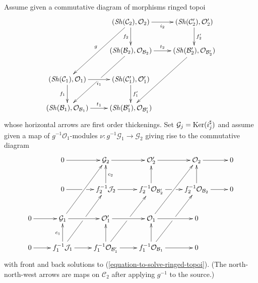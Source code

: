 \begin{lemma}
\label{lemma-huge-diagram-ringed-topoi}
Assume given a commutative diagram of morphisms ringed topoi
\begin{equation}
\label{equation-huge-1-ringed-topoi}
\vcenter{
\xymatrix{
& (\Sh(\mathcal{C}_2), \mathcal{O}_2) \ar[r]_{i_2} \ar[d]_{f_2} \ar[ddl]_g &
(\Sh(\mathcal{C}'_2), \mathcal{O}'_2) \ar[d]^{f'_2} \\
&
(\Sh(\mathcal{B}_2), \mathcal{O}_{\mathcal{B}_2}) \ar[r]^{t_2} \ar[ddl]|\hole &
(\Sh(\mathcal{B}'_2), \mathcal{O}_{\mathcal{B}'_2}) \ar[ddl] \\
(\Sh(\mathcal{C}_1), \mathcal{O}_1) \ar[r]_{i_1} \ar[d]_{f_1} &
(\Sh(\mathcal{C}'_1), \mathcal{O}'_1) \ar[d]^{f'_1} \\
(\Sh(\mathcal{B}_1), \mathcal{O}_{\mathcal{B}_1}) \ar[r]^{t_1} &
(\Sh(\mathcal{B}'_1), \mathcal{O}_{\mathcal{B}'_1})
}
}
\end{equation}
whose horizontal arrows are first order thickenings. Set
$\mathcal{G}_j = \mathop{\mathrm{Ker}}(i_j^\sharp)$ and assume given a
map of $g^{-1}\mathcal{O}_1$-modules
$\nu : g^{-1}\mathcal{G}_1 \to \mathcal{G}_2$
giving rise to the commutative diagram
\begin{equation}
\label{equation-huge-2-ringed-topoi}
\vcenter{
\xymatrix{
& 0 \ar[r] & \mathcal{G}_2 \ar[r] &
\mathcal{O}'_2 \ar[r] &
\mathcal{O}_2 \ar[r] & 0 \\
& 0 \ar[r]|\hole &
f_2^{-1}\mathcal{J}_2 \ar[u]_{c_2} \ar[r] &
f_2^{-1}\mathcal{O}_{\mathcal{B}'_2} \ar[u] \ar[r]|\hole &
f_2^{-1}\mathcal{O}_{\mathcal{B}_2} \ar[u] \ar[r] & 0 \\
0 \ar[r] &
\mathcal{G}_1 \ar[ruu] \ar[r] &
\mathcal{O}'_1 \ar[r] &
\mathcal{O}_1 \ar[ruu] \ar[r] & 0 \\
0 \ar[r] &
f_1^{-1}\mathcal{J}_1 \ar[ruu]|\hole \ar[u]^{c_1} \ar[r] &
f_1^{-1}\mathcal{O}_{\mathcal{B}'_1} \ar[ruu]|\hole \ar[u] \ar[r] &
f_1^{-1}\mathcal{O}_{\mathcal{B}_1} \ar[ruu]|\hole \ar[u] \ar[r] & 0
}
}
\end{equation}
with front and back solutions to (\ref{equation-to-solve-ringed-topoi}).
(The north-north-west arrows are maps on $\mathcal{C}_2$ after applying
$g^{-1}$ to the source.)
\end{lemma}
